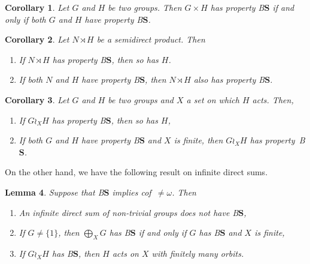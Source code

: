 \documentclass[a4paper]{article}
\newtheorem{lem}{Lemma}[section]
\newtheorem{cor}[lem]{Corollary}
\theoremstyle{definition}
\newcommand*{\BS}{B$\mathbf{S}$}
\begin{document}
%
%
%
%
\begin{cor}\label{Cor:Prod}
Let $G$ and $H$ be two groups. Then $G\times H$ has property \BS{} if and only if both $G$ and $H$ have property \BS.
\end{cor}
%
%
\begin{cor}\label{Cor:Semidirect}
Let $N\rtimes H$ be a semidirect product. Then
\begin{enumerate}
\item
If $N\rtimes H$ has property \BS, then so has $H$.
\item
If both $N$ and $H$ have property \BS, then $N\rtimes H$ also has property \BS.
\end{enumerate}
\end{cor}
%
\begin{cor}\label{Cor:Wreath}
Let $G$ and $H$ be two groups and $X$ a set on which $H$ acts. Then,
\begin{enumerate}
\item
If $G\wr_X H$ has property \BS, then so has $H$,
\item
If both $G$ and $H$ have property \BS{} and $X$ is finite, then $G\wr_X H$ has property~\BS.
\end{enumerate}
\end{cor}
%
%
On the other hand, we have the following result on infinite direct sums.
%
%
\begin{lem}\label{Lemma:Cof}
Suppose that \BS{} implies cof~$\neq\omega$. Then
\begin{enumerate}
\item An infinite direct sum of non-trivial groups does not have \BS,
\item If $G\neq\{1\}$, then $\bigoplus_XG$ has \BS{} if and only if $G$ has \BS{} and $X$ is finite,
\item If $G\wr_XH$ has \BS, then $H$ acts on $X$ with finitely many orbits.
\end{enumerate}
\end{lem}
\end{document}
